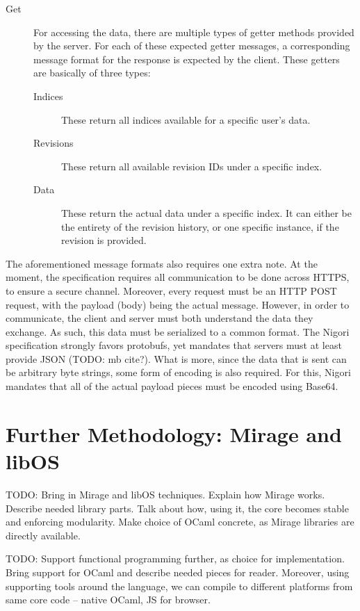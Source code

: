 \begin{description}
\begin{description}
    \item[Get] For accessing the data, there are multiple types of getter methods provided by the server.
    For each of these expected getter messages, a corresponding message format for the response is expected by the client.
    These getters are basically of three types:
    \begin{description}
      \item[Indices] These return all indices available for a specific user's data.
      \item[Revisions] These return all available revision IDs under a specific index.
      \item[Data] These return the actual data under a specific index.
      It can either be the entirety of the revision history, or one specific instance, if the revision is provided.
    \end{description}
  \end{description}
\end{description}

The aforementioned message formats also requires one extra note.
At the moment, the specification requires all communication to be done across HTTPS, to ensure a secure channel.
Moreover, every request must be an HTTP POST request, with the payload (body) being the actual message.
However, in order to communicate, the client and server must both understand the data they exchange.
As such, this data must be serialized to a common format.
The Nigori specification strongly favors protobufs, yet mandates that servers must at least provide JSON (TODO: mb cite?).
What is more, since the data that is sent can be arbitrary byte strings, some form of encoding is also required.
For this, Nigori mandates that all of the actual payload pieces must be encoded using Base64.

\section{Further Methodology: Mirage and libOS}
TODO: Bring in Mirage and libOS techniques. Explain how Mirage works. Describe needed library parts. Talk about how, using it, the core becomes stable and enforcing modularity. Make choice of OCaml concrete, as Mirage libraries are directly available.

TODO: Support functional programming further, as choice for implementation. Bring support for OCaml and describe needed pieces for reader. Moreover, using supporting tools around the language, we can compile to different platforms from same core code -- native OCaml, JS for browser.
